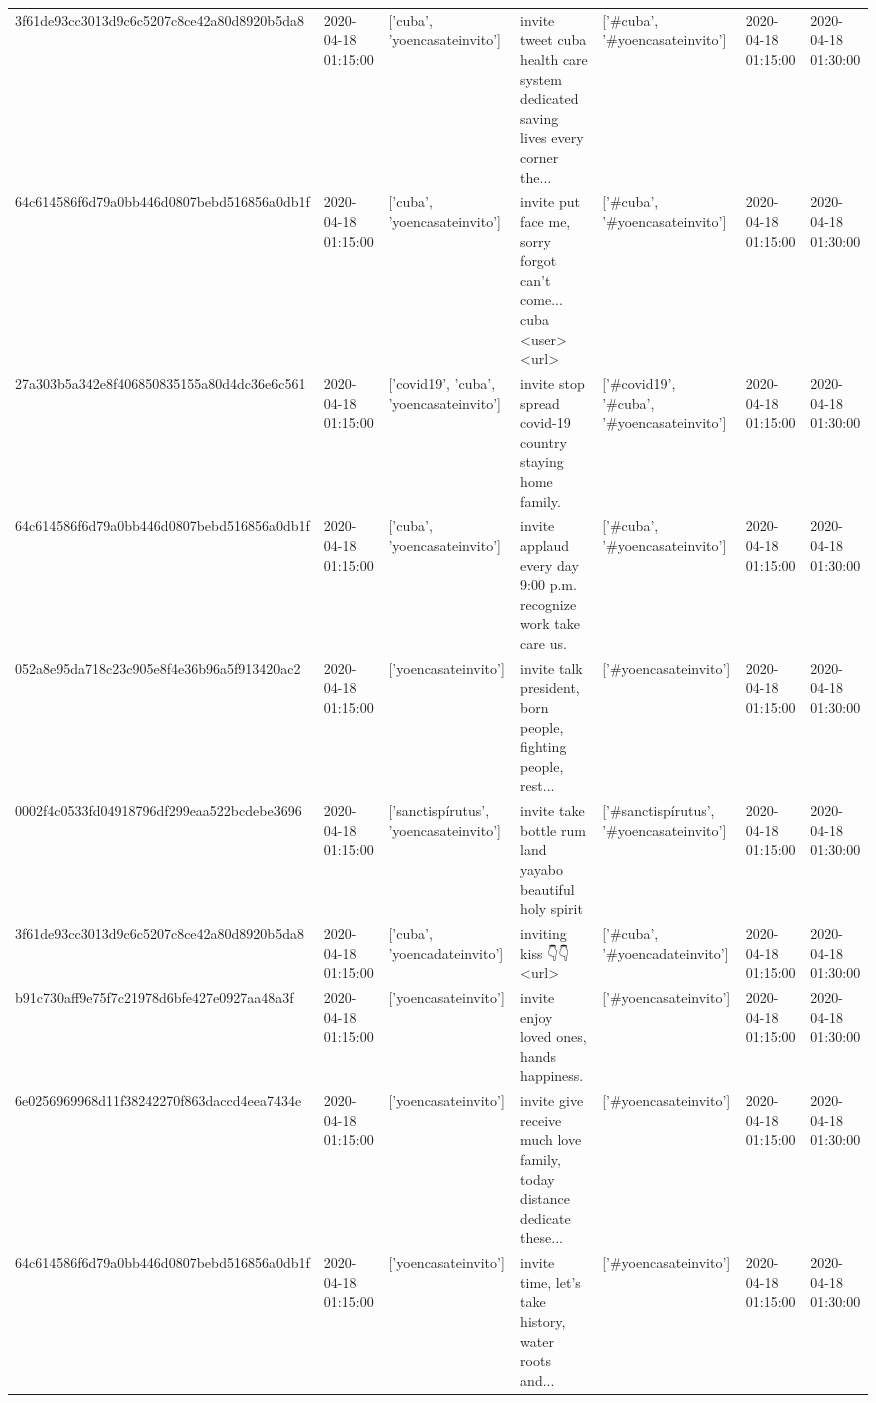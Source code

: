 \begin{tabular}{lllllll}
3f61de93cc3013d9c6c5207c8ce42a80d8920b5da8 & 2020-04-18 01:15:00 & ['cuba', 'yoencasateinvito'] & invite tweet cuba health care system dedicated saving lives every corner the... & ['#cuba', '#yoencasateinvito'] & 2020-04-18 01:15:00 & 2020-04-18 01:30:00 \\
64c614586f6d79a0bb446d0807bebd516856a0db1f & 2020-04-18 01:15:00 & ['cuba', 'yoencasateinvito'] & invite put face me, sorry forgot can't come... cuba <user> <url> & ['#cuba', '#yoencasateinvito'] & 2020-04-18 01:15:00 & 2020-04-18 01:30:00 \\
27a303b5a342e8f406850835155a80d4dc36e6c561 & 2020-04-18 01:15:00 & ['covid19', 'cuba', 'yoencasateinvito'] & invite stop spread covid-19 country staying home family. & ['#covid19', '#cuba', '#yoencasateinvito'] & 2020-04-18 01:15:00 & 2020-04-18 01:30:00 \\
64c614586f6d79a0bb446d0807bebd516856a0db1f & 2020-04-18 01:15:00 & ['cuba', 'yoencasateinvito'] & invite applaud every day 9:00 p.m. recognize work take care us. & ['#cuba', '#yoencasateinvito'] & 2020-04-18 01:15:00 & 2020-04-18 01:30:00 \\
052a8e95da718c23c905e8f4e36b96a5f913420ac2 & 2020-04-18 01:15:00 & ['yoencasateinvito'] & invite talk president, born people, fighting people, rest... & ['#yoencasateinvito'] & 2020-04-18 01:15:00 & 2020-04-18 01:30:00 \\
0002f4c0533fd04918796df299eaa522bcdebe3696 & 2020-04-18 01:15:00 & ['sanctispírutus', 'yoencasateinvito'] & invite take bottle rum land yayabo beautiful holy spirit & ['#sanctispírutus', '#yoencasateinvito'] & 2020-04-18 01:15:00 & 2020-04-18 01:30:00 \\
3f61de93cc3013d9c6c5207c8ce42a80d8920b5da8 & 2020-04-18 01:15:00 & ['cuba', 'yoencadateinvito'] & inviting kiss 👇👇 <url> & ['#cuba', '#yoencadateinvito'] & 2020-04-18 01:15:00 & 2020-04-18 01:30:00 \\
b91c730aff9e75f7c21978d6bfe427e0927aa48a3f & 2020-04-18 01:15:00 & ['yoencasateinvito'] & invite enjoy loved ones, hands happiness. & ['#yoencasateinvito'] & 2020-04-18 01:15:00 & 2020-04-18 01:30:00 \\
6e0256969968d11f38242270f863daccd4eea7434e & 2020-04-18 01:15:00 & ['yoencasateinvito'] & invite give receive much love family, today distance dedicate these... & ['#yoencasateinvito'] & 2020-04-18 01:15:00 & 2020-04-18 01:30:00 \\
64c614586f6d79a0bb446d0807bebd516856a0db1f & 2020-04-18 01:15:00 & ['yoencasateinvito'] & invite time, let's take history, water roots and... & ['#yoencasateinvito'] & 2020-04-18 01:15:00 & 2020-04-18 01:30:00 \\

\end{tabular}

